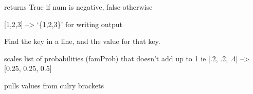 \documentclass[letterpaper,10pt,english]{sphinxmanual}
\begin{document}
\begin{fulllineitems}
\begin{fulllineitems}
\end{fulllineitems}


\begin{fulllineitems}
\label{\detokenize{pydfnworks:pydfnworks.helper.input_helper.is_negative}}
\sphinxquotedblleft{}returns True if num is negative, false otherwise

\end{fulllineitems}


\begin{fulllineitems}
\label{\detokenize{pydfnworks:pydfnworks.helper.input_helper.list_to_curly}}
{[}1,2,3{]} --\textgreater{} `\{1,2,3\}'   for writing output

\end{fulllineitems}


\begin{fulllineitems}
\label{\detokenize{pydfnworks:pydfnworks.helper.input_helper.process_line}}
Find the key in a line, and the value for that key.

\end{fulllineitems}


\begin{fulllineitems}
\label{\detokenize{pydfnworks:pydfnworks.helper.input_helper.scale}}
scales list of probabilities (famProb) that doesn't add up to 1
ie {[}.2, .2, .4{]} --\textgreater{} {[}0.25, 0.25, 0.5{]}

\end{fulllineitems}


\begin{fulllineitems}
\label{\detokenize{pydfnworks:pydfnworks.helper.input_helper.val_helper}}
pulls values from culry brackets


\end{fulllineitems}
\end{fulllineitems}
\end{document}
